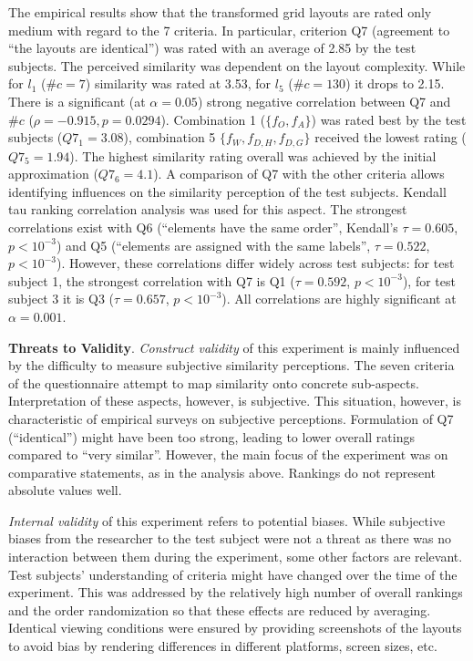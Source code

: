The empirical results show that the transformed grid layouts are rated only medium with regard to the 7 criteria.
In particular, criterion Q7 (agreement to ``the layouts are identical'') was rated with an average of 2.85 by the test subjects.
The perceived similarity was dependent on the layout complexity.
While for \(l_1\) (\(\#c=7\)) similarity was rated at 3.53, for \(l_5\) (\(\#c=130\)) it drops to 2.15.
There is a significant (at \(\alpha = 0.05\)) strong negative correlation between Q7 and \(\# c\) (\(\rho=-0.915, p=0.0294\)).
Combination 1 (\(\{f_O, f_A\}\)) was rated best by the test subjects (\(Q7_1=3.08\)), combination 5 \(\{f_W, f_{D,H}, f_{D,G}\}\) received the lowest rating (\(Q7_5=1.94\)).
The highest similarity rating overall was achieved by the initial approximation (\(Q7_6=4.1\)).
A comparison of Q7 with the other criteria allows identifying influences on the similarity perception of the test subjects.
Kendall tau ranking correlation analysis was used for this aspect.
The strongest correlations exist with Q6 (``elements have the same order'', Kendall's \(\tau = 0.605\), \(p<10^{-3}\)) and Q5 (``elements are assigned with the same labels'', \(\tau = 0.522\), \(p<10^{-3}\)).
However, these correlations differ widely across test subjects: for test subject 1, the strongest correlation with Q7 is Q1 (\(\tau = 0.592\), \(p<10^{-3}\)), for test subject 3 it is Q3 (\(\tau = 0.657\), \(p<10^{-3}\)).
All correlations are highly significant at \(\alpha = 0.001\).

\textbf{Threats to Validity}.
\emph{Construct validity} of this experiment is mainly influenced by the difficulty to measure subjective similarity perceptions.
The seven criteria of the questionnaire attempt to map similarity onto concrete sub-aspects.
Interpretation of these aspects, however, is subjective.
This situation, however, is characteristic of empirical surveys on subjective perceptions.
Formulation of Q7 (``identical'') might have been too strong, leading to lower overall ratings compared to ``very similar''.
However, the main focus of the experiment was on comparative statements, as in the analysis above.
Rankings do not represent absolute values well.

\emph{Internal validity} of this experiment refers to potential biases.
While subjective biases from the researcher to the test subject were not a threat as there was no interaction between them during the experiment, some other factors are relevant.
Test subjects' understanding of criteria might have changed over the time of the experiment.
This was addressed by the relatively high number of overall rankings and the order randomization so that these effects are reduced by averaging.
Identical viewing conditions were ensured by providing screenshots of the layouts to avoid bias by rendering differences in different platforms, screen sizes, etc.

